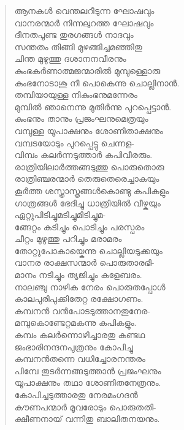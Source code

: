 \begin{verse}
ആനകള്‍ വെന്തലറീടുന്ന ഘോഷവും\\
വാനരന്മാര്‍ നിന്നലുറത്ത ഘോഷവും\\
ദീനതപൂണ്ട തുരഗങ്ങള്‍ നാദവും\\
സന്തതം തിങ്ങി മുഴങ്ങിച്ചമഞ്ഞിതു\\
ചിന്ത മുഴുത്തു ദശാനനവീരനും\\
കുംഭകര്‍ണാത്മജന്മാരില്‍ മുമ്പുള്ളൊരു\\
കുംഭനോടാശു നീ പൊകെന്നു ചൊല്ലിനാന്‍.\\
തമ്പിയായുള്ള നികുംഭനുമന്നേരം\\
മുമ്പില്‍ ഞാനെന്നു മുതിര്‍ന്നു പുറപ്പെട്ടാന്‍.\\
കുംഭനും താനും പ്രജംഘനുമെത്രയും\\
വമ്പുള്ള യൂപാക്ഷനും ശോണിതാക്ഷനും\\
വമ്പടയോടും പുറപ്പെട്ടു ചെന്നള-\\
വിമ്പം കലര്‍ന്നടുത്താര്‍ കപിവീരരും.\\
രാത്രിയിലാര്‍ത്തങ്ങടുത്തു പൊരുതൊരു\\
രാത്രിഞ്ചരന്മാര്‍ തെരുതെരെച്ചാകയും\\
കൂര്‍ത്ത ശസ്ത്രാസ്ത്രങ്ങള്‍കൊണ്ടു കപികളും\\
ഗാത്രങ്ങള്‍ ഭേദിച്ചു ധാത്രിയില്‍ വീഴ്കയും\\
ഏറ്റുപിടിച്ചുമടിച്ചുമിടിച്ചുമ-\\
ങ്ങേറ്റം കടിച്ചും പൊടിച്ചും പരസ്പരം\\
ചീറ്റം മുഴുത്തു പറിച്ചും മരാമരം\\
തോറ്റുപോകായ്കെന്നു ചൊല്ലിയടുക്കയും\\
വാനര രാക്ഷസന്മാര്‍ പൊരുതാരഭി-\\
മാനം നടിച്ചും ത്യജിച്ചും കളേബരം.\\
നാലഞ്ചു നാഴിക നേരം പൊരുതപ്പോള്‍\\
കാലപുരിപുക്കിതേറ്റ രക്ഷോഗണം.\\
കമ്പനന്‍ വന്‍പോടടുത്താനതുനേര-\\
മമ്പുകൊണ്ടേറ്റമകന്നു കപികളും.\\
കമ്പം കലര്‍ന്നൊഴിച്ചാരതു കണ്ടഥ\\
ജംഭാരിനന്ദനപുത്രനും കോപിച്ചു\\
കമ്പനന്‍തന്നെ വധിച്ചോരനന്തരം\\
പിമ്പേ തുടര്‍ന്നങ്ങടുത്താന്‍ പ്രജംഘനും\\
യൂപാക്ഷനും തഥാ ശോണിതനേത്രനും.\\
കോപിച്ചടുത്താരതു നേരമംഗദന്‍\\
കൗണപന്മാര്‍ മൂവരോടും പൊരുതതി-\\
ക്ഷീണനായ് വന്നിതു ബാലിതനയനും.\\

\end{verse}
